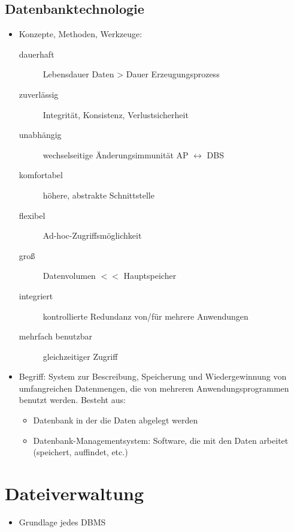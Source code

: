\documentclass[a4paper, 12pt]{scrartcl}
\begin{document}
\subsection{Datenbanktechnologie}
\begin{itemize}
	\item
		Konzepte, Methoden, Werkzeuge:
		\begin{description}
			\item[dauerhaft] Lebensdauer Daten > Dauer Erzeugungsprozess
			\item[zuverlässig] Integrität, Konsistenz, Verlustsicherheit
			\item[unabhängig] wechselseitige Änderungsimmunität AP $\leftrightarrow$ DBS
			\item[komfortabel] höhere, abstrakte Schnittstelle
			\item[flexibel] Ad-hoc-Zugriffsmöglichkeit
			\item[groß] Datenvolumen $<<$ Hauptspeicher
			\item[integriert] kontrollierte Redundanz von/für mehrere Anwendungen
			\item[mehrfach benutzbar] gleichzeitiger Zugriff
		\end{description}
	\item
		Begriff: System zur Bescreibung, Speicherung und Wiedergewinnung von umfangreichen Datenmengen, die von mehreren Anwendungsprogrammen benutzt werden. Besteht aus:
		\begin{itemize}
			\item
				Datenbank in der die Daten abgelegt werden
			\item
				Datenbank-Managementsystem: Software, die mit den Daten arbeitet (speichert, auffindet, etc.)
		\end{itemize}
\end{itemize}
\section{Dateiverwaltung}
\begin{itemize}
	\item
		Grundlage jedes DBMS
\end{itemize}
\end{document}
